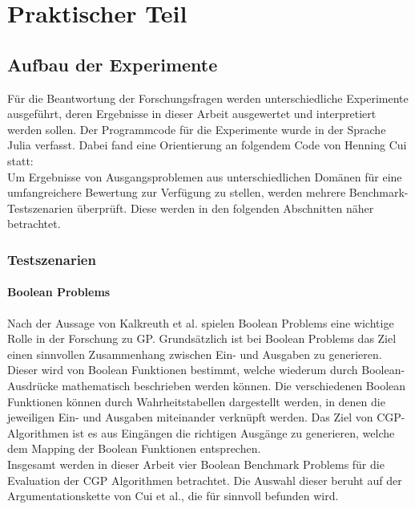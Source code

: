 \chapter{Praktischer Teil}
\label{praktischer Teil}

\section{Aufbau der Experimente}
\label{sec:aufbauExperimente}

Für die Beantwortung der Forschungsfragen werden unterschiedliche Experimente ausgeführt, deren Ergebnisse in dieser Arbeit ausgewertet und interpretiert werden sollen.
Der Programmcode für die Experimente wurde in der Sprache Julia verfasst.
Dabei fand eine Orientierung an folgendem Code von Henning Cui statt: \cite{cuihen_cuihencgp_with_crossover_strategies_2024}\\
Um Ergebnisse von Ausgangsproblemen aus unterschiedlichen Domänen für eine umfangreichere Bewertung zur Verfügung zu stellen, werden mehrere Benchmark-Testszenarien überprüft.
Diese werden in den folgenden Abschnitten näher betrachtet.

\subsection{Testszenarien}
\label{subsec:testszenarien}

\subsubsection{Boolean Problems}
\label{subsubsec:booleanProblems}

Nach der Aussage von Kalkreuth et al. spielen Boolean Problems eine wichtige Rolle in der Forschung zu GP.
Grundsätzlich ist bei Boolean Problems das Ziel einen sinnvollen Zusammenhang zwischen Ein- und Ausgaben zu generieren.
Dieser wird von Boolean Funktionen bestimmt, welche wiederum durch Boolean-Ausdrücke mathematisch beschrieben werden können.
Die verschiedenen Boolean Funktionen können durch Wahrheitstabellen dargestellt werden, in denen die jeweiligen Ein- und Ausgaben miteinander verknüpft werden. \cite{kalkreuth_towards_2023}
Das Ziel von CGP-Algorithmen ist es aus Eingängen die richtigen Ausgänge zu generieren, welche dem Mapping der Boolean Funktionen entsprechen.\\

Insgesamt werden in dieser Arbeit vier Boolean Benchmark Problems für die Evaluation der CGP Algorithmen betrachtet.
Die Auswahl dieser beruht auf der Argumentationskette von Cui et al., die für sinnvoll befunden wird.

